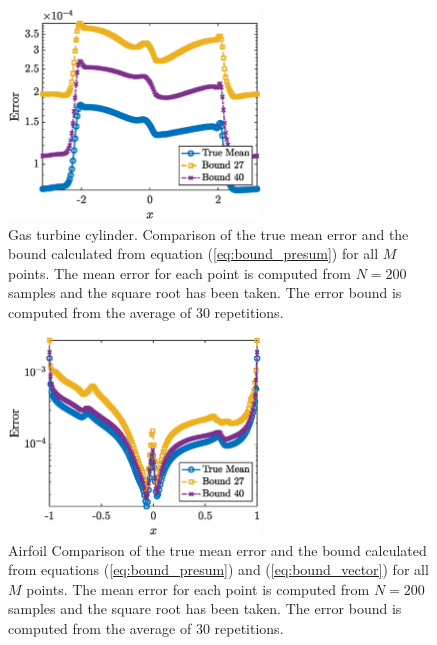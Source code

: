 \documentclass{report}
\begin{document}
% 
\begin{figure}[ht!]
\centering
\includegraphics[width =0.6\textwidth]{Figures/GT_cylinder_eq_27_bound_30reps.eps}
\caption{Gas turbine cylinder. Comparison of the true mean error and the bound calculated from equation (\ref{eq:bound_presum}) for all $M$ points. The mean error for each point is computed from $N=200$ samples and the square root has been taken. The error bound is computed from the average of $30$ repetitions.} 
\label{fig:GT_cylinder_eq_27_bound_reps}
\end{figure}
%



% 
\begin{figure}[ht!]
\centering
\includegraphics[width =0.6\textwidth]{Figures/Airfoil_eq_27_bound_30reps.eps}
\caption{Airfoil Comparison of the true mean error and the bound calculated from equations (\ref{eq:bound_presum}) and (\ref{eq:bound_vector}) for all $M$ points. The mean error for each point is computed from $N=200$ samples and the square root has been taken. The error bound is computed from the average of 30 repetitions.} 
\label{fig:Airfoil_eq_27_bound_reps}
\end{figure}
%
\end{document}
